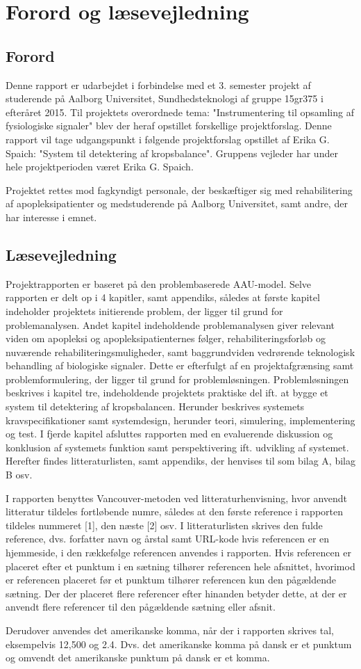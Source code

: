 \chapter*{Forord og læsevejledning}
\section{Forord}
Denne rapport er udarbejdet i forbindelse med et 3. semester projekt af studerende på Aalborg Universitet,  Sundhedsteknologi af gruppe 15gr375 i efteråret 2015. Til projektets overordnede tema: "Instrumentering til opsamling af fysiologiske signaler" blev der heraf opstillet forskellige projektforslag. Denne rapport vil tage udgangspunkt i følgende projektforslag opstillet af Erika G. Spaich: "System til detektering af kropsbalance". Gruppens vejleder har under hele projektperioden været Erika G. Spaich.

Projektet rettes mod fagkyndigt personale, der beskæftiger sig med rehabilitering af apopleksipatienter og medstuderende på Aalborg Universitet, samt andre, der har interesse i emnet. 

\section{Læsevejledning}
Projektrapporten er baseret på den problembaserede AAU-model. Selve rapporten er delt op i 4 kapitler, samt appendiks, således at første kapitel indeholder projektets initierende problem, der ligger til grund for problemanalysen. Andet kapitel indeholdende problemanalysen giver relevant viden om apopleksi og apopleksipatienternes følger, rehabiliteringsforløb og nuværende rehabiliteringsmuligheder, samt baggrundviden vedrørende teknologisk behandling af biologiske signaler.  Dette er efterfulgt af en projektafgrænsing samt problemformulering, der ligger til grund for problemløsningen. Problemløsningen beskrives i kapitel tre, indeholdende projektets praktiske del ift. at bygge et system til detektering af kropsbalancen. Herunder beskrives systemets kravspecifikationer samt systemdesign, herunder teori, simulering, implementering og test. I fjerde kapitel afsluttes rapporten med en evaluerende diskussion og konklusion af systemets funktion samt perspektivering ift. udvikling af systemet. Herefter findes litteraturlisten, samt appendiks, der henvises til som bilag A, bilag B osv. 

I rapporten benyttes Vancouver-metoden ved litteraturhenvisning, hvor anvendt litteratur tildeles fortløbende numre, således at den første reference i rapporten tildeles nummeret [1], den næste [2] osv. I litteraturlisten skrives den fulde reference, dvs. forfatter navn og årstal samt URL-kode hvis referencen er en hjemmeside, i den rækkefølge referencen anvendes i rapporten. Hvis referencen er placeret efter et punktum i en sætning tilhører referencen hele afsnittet, hvorimod er referencen placeret før et punktum tilhører referencen kun den pågældende sætning. Der der placeret flere referencer efter hinanden betyder dette, at der er anvendt flere referencer til den pågældende sætning eller afsnit. 

Derudover anvendes det amerikanske komma, når der i rapporten skrives tal, eksempelvis 12,500 og 2.4. Dvs. det amerikanske komma på dansk er et punktum og omvendt det amerikanske punktum på dansk er et komma.    

